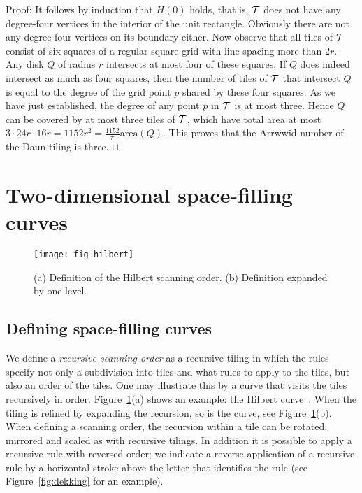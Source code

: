 \documentclass[11pt,a4paper]{article}
\newcommand{\area}{\mathrm{area}}
\newenvironment{proof}{Proof:}{\qed}
\def\squareforqed{\hbox{\rlap{$\sqcap$}$\sqcup$}}
\def\qed{\ifmmode\squareforqed\else{\unskip\nobreak\hfil
\penalty50\hskip1em\null\nobreak\hfil\squareforqed
\parfillskip=0pt\finalhyphendemerits=0\endgraf}\fi}
\begin{document}
\begin{proof}
It follows by induction that $H(0)$ holds, that is, ${\cal T}$ does not have any degree-four vertices in the interior of the unit rectangle. Obviously there are not any degree-four vertices on its boundary either. Now observe that all tiles of ${\cal T}$ consist of six squares of a regular square grid with line spacing more than $2r$. Any disk $Q$ of radius $r$ intersects at most four of these squares. If $Q$ does indeed intersect as much as four squares, then the number of tiles of ${\cal T}$ that intersect $Q$ is equal to the degree of the grid point $p$ shared by these four squares. As we have just established, the degree of any point $p$ in ${\cal T}$ is at most three. Hence $Q$ can be covered by at most three tiles of ${\cal T}$, which have total area at most $3 \cdot 24r \cdot 16r = 1152r^2 = \frac{1152}\pi \area(Q)$. This proves that the Arrwwid number of the Daun tiling is three.
\end{proof}

\section{Two-dimensional space-filling curves}
\label{sec:2DSFC}

\begin{figure}
\centering
\texttt{[image: fig-hilbert]}
\caption{(a) Definition of the Hilbert scanning order. (b) Definition expanded by one level.}
\label{fig:hilbert}
\end{figure}

\subsection{Defining space-filling curves}
\label{sec:2DSFC-definition}
We define a \emph{recursive scanning order} as a recursive tiling in which the rules specify not only a subdivision into tiles and what rules to apply to the tiles, but also an order of the tiles. One may illustrate this by a curve that visits the tiles recursively in order. Figure~\ref{fig:hilbert}(a) shows an example: the Hilbert curve~\cite{Hilbert1891}. When the tiling is refined by expanding the recursion, so is the curve, see Figure~\ref{fig:hilbert}(b). When defining a scanning order, the recursion within a tile can be rotated, mirrored and scaled as with recursive tilings. In addition it is possible to apply a recursive rule with reversed order; we indicate a reverse application of a recursive rule by a horizontal stroke above the letter that identifies the rule (see Figure~\ref{fig:dekking} for an example).
\end{document}
